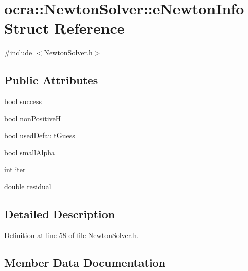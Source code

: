 \hypertarget{structocra_1_1NewtonSolver_1_1eNewtonInfo}{}\section{ocra\+:\+:Newton\+Solver\+:\+:e\+Newton\+Info Struct Reference}
\label{structocra_1_1NewtonSolver_1_1eNewtonInfo}


{\ttfamily \#include $<$Newton\+Solver.\+h$>$}

\subsection*{Public Attributes}
\begin{DoxyCompactItemize}
\item 
bool \hyperlink{structocra_1_1NewtonSolver_1_1eNewtonInfo_ad3fb93c95fbe6e760caffc64fa1739cb}{success}
\item 
bool \hyperlink{structocra_1_1NewtonSolver_1_1eNewtonInfo_a088723d14881333ae7fcc9576c7142d0}{non\+PositiveH}
\item 
bool \hyperlink{structocra_1_1NewtonSolver_1_1eNewtonInfo_a210ebc2859be22918cc378fc16a5cf88}{used\+Default\+Guess}
\item 
bool \hyperlink{structocra_1_1NewtonSolver_1_1eNewtonInfo_a034b326acca364d57a7bdeea79849625}{small\+Alpha}
\item 
int \hyperlink{structocra_1_1NewtonSolver_1_1eNewtonInfo_a3ec8816b36812a608542479168a9c18d}{iter}
\item 
double \hyperlink{structocra_1_1NewtonSolver_1_1eNewtonInfo_a5b0d53fdf4347e5bc6f4d1af784eb517}{residual}
\end{DoxyCompactItemize}


\subsection{Detailed Description}


Definition at line 58 of file Newton\+Solver.\+h.



\subsection{Member Data Documentation}
\hypertarget{structocra_1_1NewtonSolver_1_1eNewtonInfo_a3ec8816b36812a608542479168a9c18d}{}\label{structocra_1_1NewtonSolver_1_1eNewtonInfo_a3ec8816b36812a608542479168a9c18d} 
